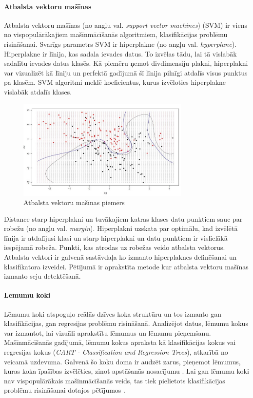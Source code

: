 \paragraph{Atbalsta vektoru mašīnas}
\hfill\par
Atbalsta vektoru mašīnas (no angļu val. \textit{support vector machines}) (SVM) ir viens no vispopulārākajiem mašīnmācīšanās algoritmiem, klasifikācijas problēmu risināšanai. Svarīgs parametrs SVM ir hiperplakne (no angļu val. \textit{hyperplane}). Hiperplakne ir līnija, kas sadala ievades datus. To izvēlas tādu, lai tā vislabāk sadalītu ievades datus klasēs. Kā piemēru ņemot divdimensiju plakni, hiperplakni var vizualizēt kā līniju un perfektā gadījumā šī līnija pilnīgi atdalīs visus punktus pa klasēm. SVM algoritmi meklē koeficientus, kurus izvēloties hiperplakne vislabāk atdalīs klases. 
\begin{figure}[h]%
	\centering
	\includegraphics[height=5cm]{images/svm.png} %
	\caption{Atbalsta vektoru mašīnas piemērs}%
	\label{fig:example}%
\end{figure} 

Distance starp hiperplakni un tuvākajiem katras klases datu punktiem sauc par robežu (no angļu val. \textit{margin}). Hiperplakni uzskata par optimālu, kad izvēlētā līnija ir atdalījusi klasi un starp hiperplakni un datu punktiem ir vislielākā iespējamā robeža. Punkti, kas atrodas uz robežas veido atbalsta vektorus. Atbalsta vektori ir galvenā sastāvdaļa ko izmanto hiperplaknes definēšanai un klasifikatora izveidei. Pētījumā \cite{campadelli2003color} ir aprakstīta metode kur atbalsta vektoru mašīnas izmanto seju detektēšanā.
\paragraph{Lēmumu koki}
\hfill\par
Lēmumu koki atspoguļo reālās dzīves koka struktūru un tos izmanto gan klasifikācijas, gan regresijas problēmu risināšanā. Analizējot datus, lēmumu kokus var izmantot, lai vizuāli aprakstītu lēmumus un lēmumu pieņemšanu. Mašīnmācīšanās gadījumā, lēmumu kokus apraksta kā klasifikācijas kokus vai regresijas kokus (\textit{CART - Classification and Regression Trees}), atkarībā no veicamā uzdevuma.  Galvenā šo koku doma ir audzēt zarus, pieņemot lēmumus, kuras koka īpašības izvēlēties, zinot apstāšanās nosacījumu \cite{dectree}. Lai gan lēmumu koki nav vispopulārākais mašīnmācīšanās veids, tas tiek pielietots klasifikācijas problēmu risināšanai dotajos pētījumos \cite{dectreepaper,pal2003assessment}.
\newpage
